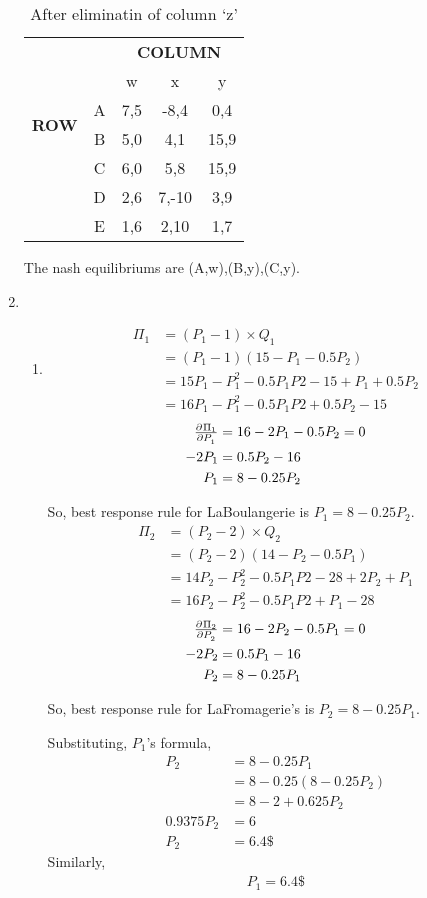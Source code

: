\documentclass[a4paper,12pt]{article}
\begin{document}
\begin{enumerate}
\begin{table}[H]
\centering
\begin{tabular}{@{}ccccc@{}}
\toprule
\multicolumn{2}{c}{} & \multicolumn{3}{c}{\bfseries COLUMN}\\
\multicolumn{2}{c}{} & w & x & y\\
\multirow{2}{*}{\bfseries ROW} & A & 7,5 & -8,4 & 0,4\\
 & B & 5,0 & 4,1 & 15,9\\
 & C & 6,0 & 5,8 & 15,9\\
 & D & 2,6 & 7,-10 & 3,9\\
 & E & 1,6 & 2,10 & 1,7\\
 \bottomrule
\end{tabular}
\caption{After eliminatin of column `z'}
\end{table}
The nash equilibriums are (A,w),(B,y),(C,y).

\item%
\begin{enumerate}
\item
\begin{align*}
\Pi_1 &= (P_1-1)\times Q_1\\
&=(P_1-1)(15-P_1-0.5P_2)\\
&=15P_1-P_1^2-0.5P_1P2-15+P_1+0.5P_2\\
&=16P_1-P_1^2-0.5P_1P2+0.5P_2-15
\end{align*}
\begin{align*}
\pd{\Pi_1}{P_1} &= 16-2P_1-0.5P_2=0\\
-2P_1 &= 0.5P_2-16\\
P_1 &= 8-0.25P_2
\end{align*}

So, best response rule for LaBoulangerie is $P_1 = 8-0.25P_2$.
\begin{align*}
\Pi_2 &= (P_2-2)\times Q_2\\
&=(P_2-2)(14-P_2-0.5P_1)\\
&=14P_2-P_2^2-0.5P_1P2-28+2P_2+P_1\\
&=16P_2-P_2^2-0.5P_1P2+P_1-28
\end{align*}
\begin{align*}
\pd{\Pi_2}{P_2} &= 16-2P_2-0.5P_1=0\\
-2P_2 &= 0.5P_1-16\\
P_2 &= 8-0.25P_1
\end{align*}

So, best response rule for LaFromagerie’s is $P_2 = 8-0.25P_1$.

Substituting, $P_1$'s formula,
\begin{align*}
P_2 &= 8-0.25P_1\\
&= 8-0.25(8-0.25P_2)\\
&=8-2+0.625P_2\\
0.9375P_2 &= 6\\
P_2 &= 6.4\$
\end{align*}
Similarly,
\begin{align*}
P_1 = 6.4\$
\end{align*}


\end{enumerate}
\end{enumerate}
\end{document}
